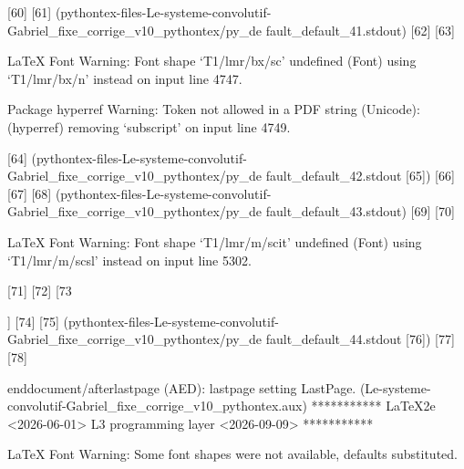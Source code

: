 [60] [61]
(pythontex-files-Le-systeme-convolutif-Gabriel_fixe_corrige_v10_pythontex/py_de
fault_default_41.stdout) [62] [63]

LaTeX Font Warning: Font shape `T1/lmr/bx/sc' undefined
(Font)              using `T1/lmr/bx/n' instead on input line 4747.


Package hyperref Warning: Token not allowed in a PDF string (Unicode):
(hyperref)                removing `subscript' on input line 4749.

[64]
(pythontex-files-Le-systeme-convolutif-Gabriel_fixe_corrige_v10_pythontex/py_de
fault_default_42.stdout [65]) [66] [67] [68]
(pythontex-files-Le-systeme-convolutif-Gabriel_fixe_corrige_v10_pythontex/py_de
fault_default_43.stdout) [69] [70]

LaTeX Font Warning: Font shape `T1/lmr/m/scit' undefined
(Font)              using `T1/lmr/m/scsl' instead on input line 5302.

[71] [72] [73

] [74] [75]
(pythontex-files-Le-systeme-convolutif-Gabriel_fixe_corrige_v10_pythontex/py_de
fault_default_44.stdout [76]) [77] [78]

enddocument/afterlastpage (AED): lastpage setting LastPage.
(Le-systeme-convolutif-Gabriel_fixe_corrige_v10_pythontex.aux)
 ***********
LaTeX2e <2026-06-01>
L3 programming layer <2026-09-09>
 ***********


LaTeX Font Warning: Some font shapes were not available, defaults substituted.

